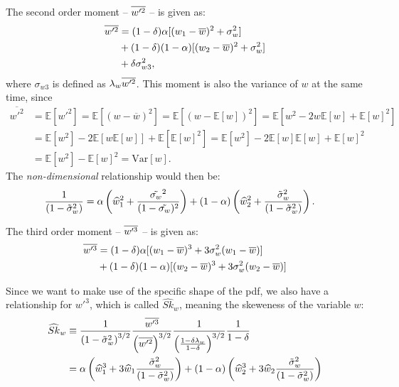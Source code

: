 The second order moment -- $\overline{w'^2}$ -- is given as:
\begin{align}
    \label{eq:wp2_bar}
    \overline{w'^2}
    &= (1 - \delta) \alpha [(w_1 - \overline{w})^2 + \sigma_w^2] \nonumber\\
    &+ (1 - \delta) (1 - \alpha) [(w_2 - \overline{w})^2 + \sigma_w^2] \nonumber\\
    &+ \delta \sigma_{w 3}^2,
\end{align}
where $\sigma_{w 3}$ is defined as $\lambda_w \overline{w'^2}$.
This moment is also the variance of $w$ at the same time, since
\begin{align*}
    \overline{w'^2}
    &= \mathbb{E}[w'^2]
    = \mathbb{E}[(w - \overline{w})^2]
    = \mathbb{E}[(w - \mathbb{E}[w])^2]
    = \mathbb{E}[w^2 -2w\mathbb{E}[w] + \mathbb{E}[w]^2] \\
    &= \mathbb{E}[w^2] - 2\mathbb{E}[w\mathbb{E}[w]] + \mathbb{E}[\mathbb{E}[w]^2]
    = \mathbb{E}[w^2] - 2\mathbb{E}[w]\mathbb{E}[w] + \mathbb{E}[w]^2 \\
    &= \mathbb{E}[w^2] - \mathbb{E}[w]^2
    = \text{Var}[w].
\end{align*}
The \emph{non-dimensional} relationship would then be:
\begin{align}
    \label{eq:wp2_bar_non_dim}
    \frac{1}{\left( 1 - \tilde{\sigma}_w^2 \right)}
    &= \alpha \left(\widehat{w}_1^2 + \frac{\tilde{\sigma_w}^2}{(1 - \tilde{\sigma_w})^2} \right)
    + (1-\alpha) \left( \widehat{w}_2^2 + \frac{{\tilde{\sigma}_w}^2}{\left( 1 - \tilde{\sigma}_w^2 \right)} \right).
\end{align}

The third order moment -- $\overline{w'^3}$ -- is given as:
\begin{align}
    \label{eq:wp3_bar}
    \overline{w'^3}
    &= (1 - \delta) \alpha [(w_1 - \overline{w})^3 + 3 \sigma_w^2 (w_1 - \overline{w})] \nonumber\\
    &+ (1 - \delta) (1 - \alpha) [(w_2 - \overline{w})^3 + 3 \sigma_w^2 (w_2 - \overline{w})]
\end{align}

Since we want to make use of the specific shape of the \gls{pdf}, we also have a relationship for $w'^3$, which is called $\widehat{Sk}_w$, meaning the skeweness of the variable $w$:
\begin{align}
    \widehat{Sk}_w
    &\equiv \frac{1}{\left( 1 - \tilde{\sigma}_w^2 \right)^{3/2}} \frac{\overline{w'^3}}{\left( \overline{w'^2} \right)^{3/2}}\frac{1}{\left(\frac{1-\delta \lambda_w}{1-\delta}\right)^{3/2}}\frac{1}{1-\delta} \nonumber \\
    &= \alpha \left(\widehat{w}_1^3 + 3 \widehat{w}_1 \frac{{\tilde{\sigma}_w}^2}{\left( 1 - \tilde{\sigma}_w^2 \right)} \right) + (1 - \alpha) \left( \widehat{w}_2^3 + 3 \widehat{w}_2 \frac{{\tilde{\sigma}_w}^2}{\left( 1 - \tilde{\sigma}_w^2 \right)} \right)
    \label{eq:sk_hat_w_nondim}
\end{align}

